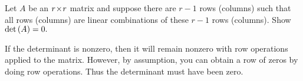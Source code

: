 
\begin{Exercise}[
name={},
title={}, 
difficulty=0,
origin={\cite{KK}}]
Let $A$ be an $r \! \times \! r$ matrix and suppose there are $r-1$ rows
(columns) such that all rows (columns) are linear combinations of these $r-1$
rows (columns). Show $\operatorname{det}\left( A\right) =0.$ 
\end{Exercise}

\begin{Answer}
If the determinant is nonzero, then it will remain nonzero with row operations applied to the matrix.
However, by assumption, you can obtain a row of zeros by doing row
operations. Thus the determinant must have been zero.
\end{Answer}
